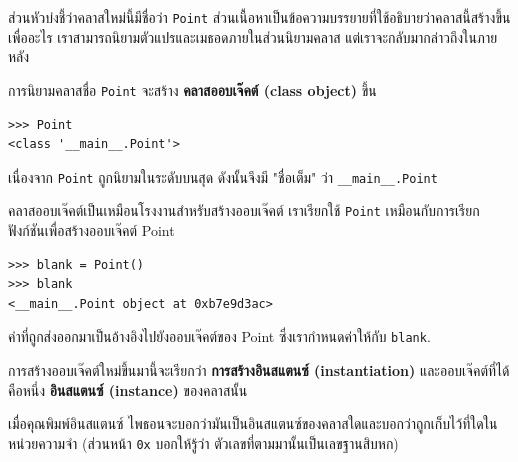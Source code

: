 ส่วนหัวบ่งชี้ว่าคลาสใหม่นี้มีชื่อว่า {\tt Point}
ส่วนเนื้อหาเป็นข้อความบรรยายที่ใช้อธิบายว่าคลาสนี้สร้างขึ้นเพื่ออะไร 
เราสามารถนิยามตัวแปรและเมธอดภายในส่วนนิยามคลาส แต่เราจะกลับมากล่าวถึงในภายหลัง

การนิยามคลาสชื่อ {\tt Point} จะสร้าง {\bf คลาสออบเจ๊คต์ (class object)} ขึ้น

\begin{verbatim}
>>> Point
<class '__main__.Point'>
\end{verbatim}
%

เนื่องจาก {\tt Point} ถูกนิยามในระดับบนสุด ดังนั้นจึงมี "ชื่อเต็ม" ว่า \verb"__main__.Point"



คลาสออบเจ๊คต์เป็นเหมือนโรงงานสำหรับสร้างออบเจ๊คต์ เราเรียกใช้ {\tt Point} เหมือนกับการเรียกฟังก์ชันเพื่อสร้างออบเจ๊คต์ Point

\begin{verbatim}
>>> blank = Point()
>>> blank
<__main__.Point object at 0xb7e9d3ac>
\end{verbatim}
%

ค่าที่ถูกส่งออกมาเป็นอ้างอิงไปยังออบเจ๊คต์ของ Point ซึ่งเรากำหนดค่าให้กับ {\tt blank}.  


การสร้างออบเจ๊คต์ใหม่ขึ้นมานี้จะเรียกว่า  
{\bf การสร้างอินสแตนซ์ (instantiation)} และออบเจ๊คต์ที่ได้คือหนึ่ง {\bf อินสแตนซ์ (instance)}  ของคลาสนั้น



เมื่อคุณพิมพ์อินสแตนซ์ ไพธอนจะบอกว่ามันเป็นอินสแตนซ์ของคลาสใดและบอกว่าถูกเก็บไว้ที่ใดในหน่วยความจำ (ส่วนหน้า
{\tt 0x} บอกให้รู้ว่า ตัวเลขที่ตามมานั้นเป็นเลขฐานสิบหก)

